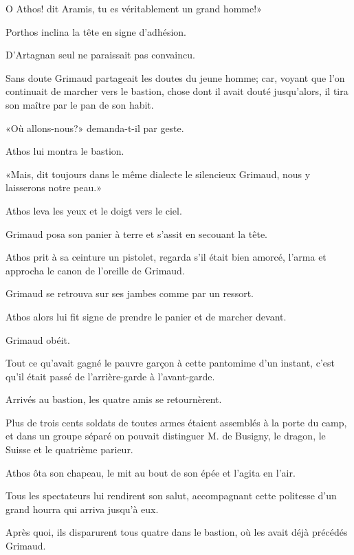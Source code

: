 \speak  O Athos! dit Aramis, tu es véritablement un grand homme!» 

Porthos inclina la tête en signe d'adhésion. 

D'Artagnan seul ne paraissait pas convaincu. 

Sans doute Grimaud partageait les doutes du jeune homme; car, voyant que l'on continuait de marcher vers le bastion, chose dont il avait douté jusqu'alors, il tira son maître par le pan de son habit. 

«Où allons-nous?» demanda-t-il par geste. 

Athos lui montra le bastion. 

«Mais, dit toujours dans le même dialecte le silencieux Grimaud, nous y laisserons notre peau.» 

Athos leva les yeux et le doigt vers le ciel. 

Grimaud posa son panier à terre et s'assit en secouant la tête. 

Athos prit à sa ceinture un pistolet, regarda s'il était bien amorcé, l'arma et approcha le canon de l'oreille de Grimaud. 

Grimaud se retrouva sur ses jambes comme par un ressort. 

Athos alors lui fit signe de prendre le panier et de marcher devant. 

Grimaud obéit. 

Tout ce qu'avait gagné le pauvre garçon à cette pantomime d'un instant, c'est qu'il était passé de l'arrière-garde à l'avant-garde. 

Arrivés au bastion, les quatre amis se retournèrent. 

Plus de trois cents soldats de toutes armes étaient assemblés à la porte du camp, et dans un groupe séparé on pouvait distinguer M. de Busigny, le dragon, le Suisse et le quatrième parieur. 

Athos ôta son chapeau, le mit au bout de son épée et l'agita en l'air. 

Tous les spectateurs lui rendirent son salut, accompagnant cette politesse d'un grand hourra qui arriva jusqu'à eux. 

Après quoi, ils disparurent tous quatre dans le bastion, où les avait déjà précédés Grimaud. 